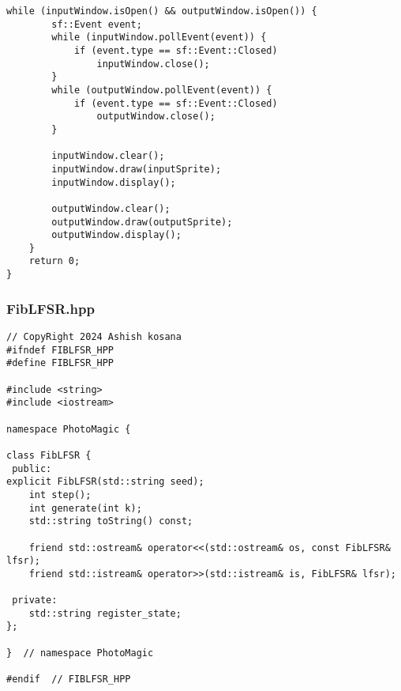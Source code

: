 \documentclass[12pt]{article}
\begin{document}
\begin{lstlisting}[style=cppcode]
    while (inputWindow.isOpen() && outputWindow.isOpen()) {
        sf::Event event;
        while (inputWindow.pollEvent(event)) {
            if (event.type == sf::Event::Closed)
                inputWindow.close();
        }
        while (outputWindow.pollEvent(event)) {
            if (event.type == sf::Event::Closed)
                outputWindow.close();
        }

        inputWindow.clear();
        inputWindow.draw(inputSprite);
        inputWindow.display();

        outputWindow.clear();
        outputWindow.draw(outputSprite);
        outputWindow.display();
    }
    return 0;
}

\end{lstlisting}
\subsubsection{FibLFSR.hpp}
\begin{lstlisting}[style=cppcode]
// CopyRight 2024 Ashish kosana
#ifndef FIBLFSR_HPP
#define FIBLFSR_HPP

#include <string>
#include <iostream>

namespace PhotoMagic {

class FibLFSR {
 public:
explicit FibLFSR(std::string seed);
    int step();
    int generate(int k);
    std::string toString() const;

    friend std::ostream& operator<<(std::ostream& os, const FibLFSR& lfsr);
    friend std::istream& operator>>(std::istream& is, FibLFSR& lfsr);

 private:
    std::string register_state;
};

}  // namespace PhotoMagic

#endif  // FIBLFSR_HPP
\end{lstlisting}
\end{document}
